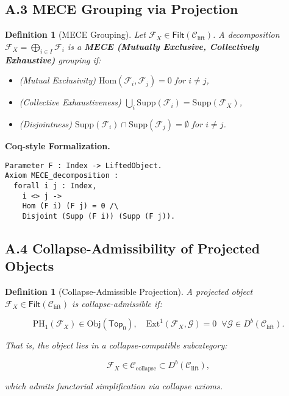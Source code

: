 \documentclass[11pt]{article}
\newtheorem{definition}[theorem]{Definition}
\begin{document}
\subsection*{A.3 MECE Grouping via Projection}

\begin{definition}[MECE Grouping]
Let \( \mathcal{F}_X \in \mathsf{Filt}(\mathcal{C}_{\mathrm{lift}}) \).  
A decomposition \( \mathcal{F}_X = \bigoplus_{i \in I} \mathcal{F}_i \) is a \textbf{MECE (Mutually Exclusive, Collectively Exhaustive)} grouping if:

\begin{itemize}
  \item (Mutual Exclusivity) \( \mathrm{Hom}(\mathcal{F}_i, \mathcal{F}_j) = 0 \) for \( i \neq j \),
  \item (Collective Exhaustiveness) \( \bigcup_{i} \mathrm{Supp}(\mathcal{F}_i) = \mathrm{Supp}(\mathcal{F}_X) \),
  \item (Disjointness) \( \mathrm{Supp}(\mathcal{F}_i) \cap \mathrm{Supp}(\mathcal{F}_j) = \emptyset \) for \( i \neq j \).
\end{itemize}
\end{definition}

\textbf{Coq-style Formalization.}
\vspace{0.5em}

\begin{lstlisting}[language=Coq]
Parameter F : Index -> LiftedObject.
Axiom MECE_decomposition :
  forall i j : Index,
    i <> j ->
    Hom (F i) (F j) = 0 /\
    Disjoint (Supp (F i)) (Supp (F j)).
\end{lstlisting}

\subsection*{A.4 Collapse-Admissibility of Projected Objects}

\begin{definition}[Collapse-Admissible Projection]
A projected object \( \mathcal{F}_X \in \mathsf{Filt}(\mathcal{C}_{\mathrm{lift}}) \) is \emph{collapse-admissible} if:

\[
\mathrm{PH}_1(\mathcal{F}_X) \in \mathrm{Obj}(\mathsf{Top}_0), \quad
\mathrm{Ext}^1(\mathcal{F}_X, \mathcal{G}) = 0 \;\; \forall \mathcal{G} \in D^b(\mathcal{C}_{\mathrm{lift}}).
\]

That is, the object lies in a collapse-compatible subcategory:

\[
\mathcal{F}_X \in \mathcal{C}_{\mathrm{collapse}} \subset D^b(\mathcal{C}_{\mathrm{lift}}),
\]

which admits functorial simplification via collapse axioms.
\end{definition}
\end{document}

